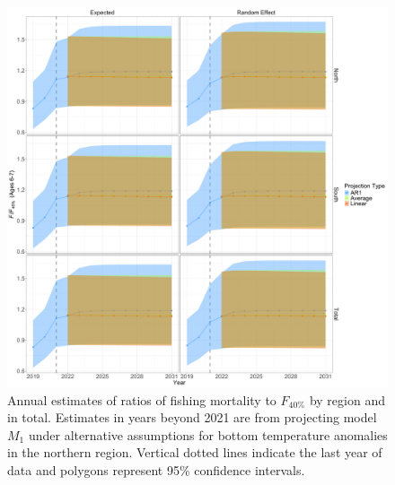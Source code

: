 \documentclass[
]{article}
\begin{document}
\begin{figure}

{\centering \includegraphics[height=0.95\textheight]{proj_F_status_results} 

}

\caption{Annual estimates of ratios of fishing mortality to $F_{40\%}$ by region and in total. Estimates in years beyond 2021 are from projecting model $M_1$ under alternative assumptions for bottom temperature anomalies in the northern region. Vertical dotted lines indicate the last year of data and polygons represent 95\% confidence intervals.}\label{fig:F-status-proj}
\end{figure}
\end{document}
